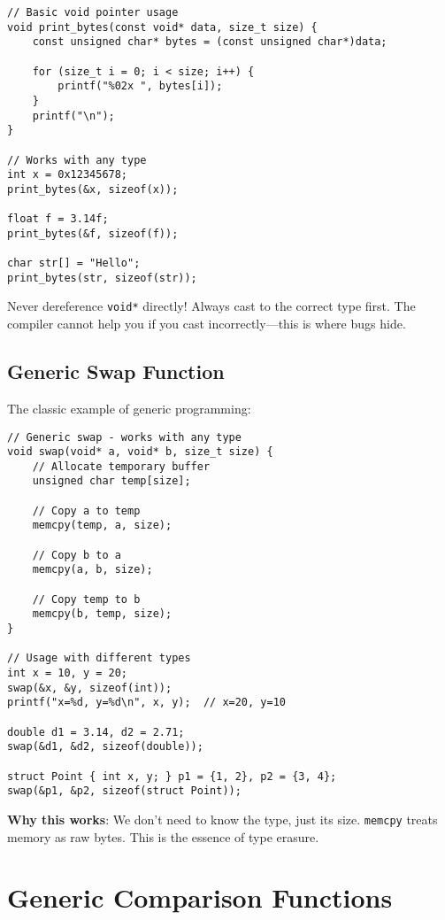 \begin{lstlisting}
// Basic void pointer usage
void print_bytes(const void* data, size_t size) {
    const unsigned char* bytes = (const unsigned char*)data;

    for (size_t i = 0; i < size; i++) {
        printf("%02x ", bytes[i]);
    }
    printf("\n");
}

// Works with any type
int x = 0x12345678;
print_bytes(&x, sizeof(x));

float f = 3.14f;
print_bytes(&f, sizeof(f));

char str[] = "Hello";
print_bytes(str, sizeof(str));
\end{lstlisting}

\begin{warningbox}
Never dereference \texttt{void*} directly! Always cast to the correct type first. The compiler cannot help you if you cast incorrectly—this is where bugs hide.
\end{warningbox}

\subsection{Generic Swap Function}

The classic example of generic programming:

\begin{lstlisting}
// Generic swap - works with any type
void swap(void* a, void* b, size_t size) {
    // Allocate temporary buffer
    unsigned char temp[size];

    // Copy a to temp
    memcpy(temp, a, size);

    // Copy b to a
    memcpy(a, b, size);

    // Copy temp to b
    memcpy(b, temp, size);
}

// Usage with different types
int x = 10, y = 20;
swap(&x, &y, sizeof(int));
printf("x=%d, y=%d\n", x, y);  // x=20, y=10

double d1 = 3.14, d2 = 2.71;
swap(&d1, &d2, sizeof(double));

struct Point { int x, y; } p1 = {1, 2}, p2 = {3, 4};
swap(&p1, &p2, sizeof(struct Point));
\end{lstlisting}

\textbf{Why this works}: We don't need to know the type, just its size. \texttt{memcpy} treats memory as raw bytes. This is the essence of type erasure.

\section{Generic Comparison Functions}

